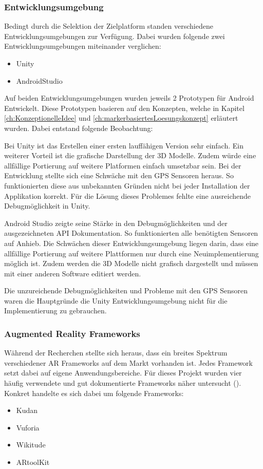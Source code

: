 \documentclass[a4paper]{scrreprt}
\begin{document}
\subsubsection{Entwicklungsumgebung}
\label{ssec:EvalPlattform}
Bedingt durch die Selektion der Zielplatform standen verschiedene Entwicklungsumgebungen zur Verfügung. Dabei wurden folgende zwei Entwicklungsumgebungen miteinander verglichen:
\begin{itemize}
\item Unity
\item AndroidStudio
\end{itemize}

Auf beiden Entwicklungsumgebungen wurden jeweils 2 Prototypen für Android Entwickelt. Diese Prototypen basieren auf den Konzepten, welche in Kapitel \ref{ch:KonzeptionelleIdee} und 
\ref{ch:markerbasiertesLoesungskonzept} erläutert wurden. Dabei entstand folgende Beobachtung:

Bei Unity ist das Erstellen einer ersten lauffähigen Version sehr einfach. Ein weiterer Vorteil ist die grafische Darstellung der 3D Modelle. Zudem würde eine allfällige Portierung auf weitere Platformen einfach umsetzbar sein. Bei der Entwicklung stellte sich eine Schwäche mit den GPS Sensoren heraus. So funktionierten diese aus unbekannten Gründen nicht bei jeder Installation der Applikation korrekt. Für die Lösung dieses Problemes fehlte eine ausreichende Debugmöglichkeit in Unity.

Android Studio zeigte seine Stärke in den Debugmöglichkeiten und der ausgezeichneten API Dokumentation. So funktionierten alle benötigten Sensoren auf Anhieb. Die Schwächen dieser Entwicklungsumgebung liegen darin, dass eine allfällige Portierung auf weitere Plattformen nur durch eine Neuimplementierung möglich ist. Zudem werden die 3D Modelle nicht grafisch dargestellt und müssen mit einer anderen Software editiert werden.

Die unzureichende Debugmöglichkeiten und Probleme mit den GPS Sensoren waren die Hauptgründe die Unity Entwicklungsumgebung nicht für die Implementierung zu gebrauchen.

\subsubsection{Augmented Reality Frameworks}
Während der Recherchen stellte sich heraus, dass ein breites Spektrum verschiedener AR Frameworks auf dem Markt vorhanden ist. Jedes Framework setzt dabei auf eigene Anwendungsbereiche. Für dieses Projekt wurden vier häufig verwendete und gut dokumentierte Frameworks näher untersucht (\cite{DDIDevelopment}). Konkret handelte es sich dabei um folgende Frameworks:
\begin{itemize}
\item Kudan
\item Vuforia
\item Wikitude
\item ARtoolKit
\end{itemize}
\end{document}
